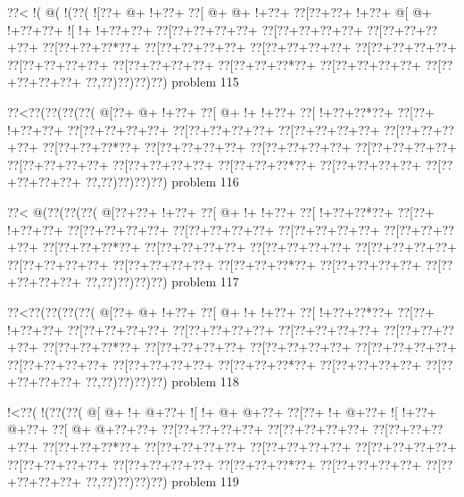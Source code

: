 \vbox{\vbox{\goo
\0??<\- !(\- @(\- !(\0??(
\- ![\0??+\- @+\- !+\0??+
\0??[\- @+\- @+\- !+\0??+
\0??[\0??+\0??+\- !+\0??+
\- @[\- @+\- !+\0??+\0??+
\- ![\- !+\- !+\0??+\0??+
\0??[\0??+\0??+\0??+\0??+
\0??[\0??+\0??+\0??+\0??+
\0??[\0??+\0??+\0??+\0??+
\0??[\0??+\0??+\0??*\0??+
\0??[\0??+\0??+\0??+\0??+
\0??[\0??+\0??+\0??+\0??+
\0??[\0??+\0??+\0??+\0??+
\0??[\0??+\0??+\0??+\0??+
\0??[\0??+\0??+\0??+\0??+
\0??[\0??+\0??+\0??*\0??+
\0??[\0??+\0??+\0??+\0??+
\0??[\0??+\0??+\0??+\0??+
\0??,\0??)\0??)\0??)\0??)
}
\hfil problem 115\hfil\break
}

\vbox{\vbox{\goo
\0??<\0??(\0??(\0??(\0??(
\- @[\0??+\- @+\- !+\0??+
\0??[\- @+\- !+\- !+\0??+
\0??[\- !+\0??+\0??*\0??+
\0??[\0??+\- !+\0??+\0??+
\0??[\0??+\0??+\0??+\0??+
\0??[\0??+\0??+\0??+\0??+
\0??[\0??+\0??+\0??+\0??+
\0??[\0??+\0??+\0??+\0??+
\0??[\0??+\0??+\0??*\0??+
\0??[\0??+\0??+\0??+\0??+
\0??[\0??+\0??+\0??+\0??+
\0??[\0??+\0??+\0??+\0??+
\0??[\0??+\0??+\0??+\0??+
\0??[\0??+\0??+\0??+\0??+
\0??[\0??+\0??+\0??*\0??+
\0??[\0??+\0??+\0??+\0??+
\0??[\0??+\0??+\0??+\0??+
\0??,\0??)\0??)\0??)\0??)
}
\hfil problem 116\hfil\break
}

\vbox{\vbox{\goo
\0??<\- @(\0??(\0??(\0??(
\- @[\0??+\0??+\- !+\0??+
\0??[\- @+\- !+\- !+\0??+
\0??[\- !+\0??+\0??*\0??+
\0??[\0??+\- !+\0??+\0??+
\0??[\0??+\0??+\0??+\0??+
\0??[\0??+\0??+\0??+\0??+
\0??[\0??+\0??+\0??+\0??+
\0??[\0??+\0??+\0??+\0??+
\0??[\0??+\0??+\0??*\0??+
\0??[\0??+\0??+\0??+\0??+
\0??[\0??+\0??+\0??+\0??+
\0??[\0??+\0??+\0??+\0??+
\0??[\0??+\0??+\0??+\0??+
\0??[\0??+\0??+\0??+\0??+
\0??[\0??+\0??+\0??*\0??+
\0??[\0??+\0??+\0??+\0??+
\0??[\0??+\0??+\0??+\0??+
\0??,\0??)\0??)\0??)\0??)
}
\hfil problem 117\hfil\break
}

\vbox{\vbox{\goo
\0??<\0??(\0??(\0??(\0??(
\- @[\0??+\- @+\- !+\0??+
\0??[\- @+\- !+\- !+\0??+
\0??[\- !+\0??+\0??*\0??+
\0??[\0??+\- !+\0??+\0??+
\0??[\0??+\0??+\0??+\0??+
\0??[\0??+\0??+\0??+\0??+
\0??[\0??+\0??+\0??+\0??+
\0??[\0??+\0??+\0??+\0??+
\0??[\0??+\0??+\0??*\0??+
\0??[\0??+\0??+\0??+\0??+
\0??[\0??+\0??+\0??+\0??+
\0??[\0??+\0??+\0??+\0??+
\0??[\0??+\0??+\0??+\0??+
\0??[\0??+\0??+\0??+\0??+
\0??[\0??+\0??+\0??*\0??+
\0??[\0??+\0??+\0??+\0??+
\0??[\0??+\0??+\0??+\0??+
\0??,\0??)\0??)\0??)\0??)
}
\hfil problem 118\hfil\break
}

\vbox{\vbox{\goo
\- !<\0??(\- !(\0??(\0??(
\- @[\- @+\- !+\- @+\0??+
\- ![\- !+\- @+\- @+\0??+
\0??[\0??+\- !+\- @+\0??+
\- ![\- !+\0??+\- @+\0??+
\0??[\- @+\- @+\0??+\0??+
\0??[\0??+\0??+\0??+\0??+
\0??[\0??+\0??+\0??+\0??+
\0??[\0??+\0??+\0??+\0??+
\0??[\0??+\0??+\0??*\0??+
\0??[\0??+\0??+\0??+\0??+
\0??[\0??+\0??+\0??+\0??+
\0??[\0??+\0??+\0??+\0??+
\0??[\0??+\0??+\0??+\0??+
\0??[\0??+\0??+\0??+\0??+
\0??[\0??+\0??+\0??*\0??+
\0??[\0??+\0??+\0??+\0??+
\0??[\0??+\0??+\0??+\0??+
\0??,\0??)\0??)\0??)\0??)
}
\hfil problem 119\hfil\break
}

